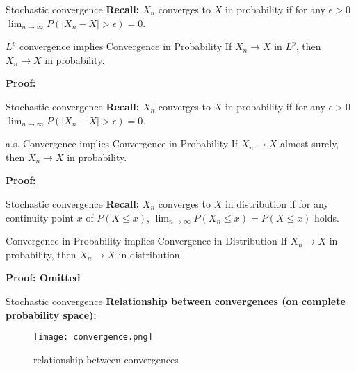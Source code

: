 \documentclass [aspectratio=169]{beamer}
\begin{document}
\begin{frame}{Stochastic convergence}
    \textbf{Recall:} $X_n$ converges to $X$ in probability if for any $\epsilon>0$ $\lim_{n\to \infty}P(|X_n - X|>\epsilon)=0$.\\
    \begin{block}{$L^p$ convergence implies Convergence in Probability}
    If $X_n \to X$ in $L^p$, then $X_n \to X$ in probability. 
    \end{block}
    \textbf{Proof: }
    \vspace{1.8in}
\end{frame}

\begin{frame}{Stochastic convergence}
    \textbf{Recall:} $X_n$ converges to $X$ in probability if for any $\epsilon>0$ $\lim_{n\to \infty}P(|X_n - X|>\epsilon)=0$.\\
    \begin{block}{a.s. Convergence implies Convergence in Probability}
    If $X_n \to X$ almost surely, then $X_n \to X$ in probability. 
    \end{block}
    \textbf{Proof: }
    \vspace{1.8in}
\end{frame}

\begin{frame}{Stochastic convergence}
    \textbf{Recall:} $X_n$ converges to $X$ in distribution if for any continuity point $x$ of $P(X\leq x)$, $\lim_{n\to \infty}P(X_n \leq x) = P(X\leq x)$ holds.\\
    \begin{block}{Convergence in Probability implies Convergence in Distribution}
    If $X_n \to X$ in probability, then $X_n \to X$ in distribution. 
    \end{block}
    \textbf{Proof: Omitted}
    \vspace{1.8in}
\end{frame}

\begin{frame}{Stochastic convergence}
    \textbf{Relationship between convergences (on complete probability space):}\\
    \begin{figure}
        \centering
        \texttt{[image: convergence.png]}
        \caption{relationship between convergences}
        \label{fig:my_label}
    \end{figure}
\end{frame}
\end{document}
